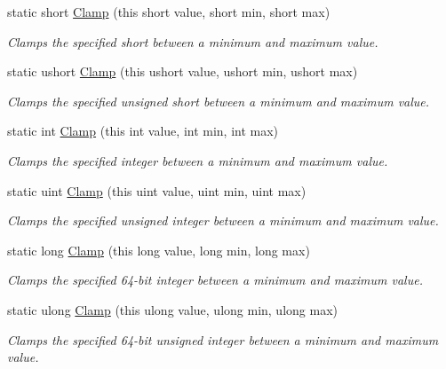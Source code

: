 \begin{DoxyCompactItemize}
\item 
static short \hyperlink{class_tri_devs_1_1_tri_engine2_d_1_1_extensions_1_1_integer_extensions_a3880786c9330dbbbdb27693548946679}{Clamp} (this short value, short min, short max)
\begin{DoxyCompactList}\small\item\em Clamps the specified short between a minimum and maximum value. \end{DoxyCompactList}\item 
static ushort \hyperlink{class_tri_devs_1_1_tri_engine2_d_1_1_extensions_1_1_integer_extensions_a3bfe7362bdb41d2af40a3001e6169f41}{Clamp} (this ushort value, ushort min, ushort max)
\begin{DoxyCompactList}\small\item\em Clamps the specified unsigned short between a minimum and maximum value. \end{DoxyCompactList}\item 
static int \hyperlink{class_tri_devs_1_1_tri_engine2_d_1_1_extensions_1_1_integer_extensions_a91d8379e75aa61d7da81b475389fb450}{Clamp} (this int value, int min, int max)
\begin{DoxyCompactList}\small\item\em Clamps the specified integer between a minimum and maximum value. \end{DoxyCompactList}\item 
static uint \hyperlink{class_tri_devs_1_1_tri_engine2_d_1_1_extensions_1_1_integer_extensions_ad1de9947d0793285110436926a60c6ec}{Clamp} (this uint value, uint min, uint max)
\begin{DoxyCompactList}\small\item\em Clamps the specified unsigned integer between a minimum and maximum value. \end{DoxyCompactList}\item 
static long \hyperlink{class_tri_devs_1_1_tri_engine2_d_1_1_extensions_1_1_integer_extensions_a290203fa17c0d1604379f8b0b1484e63}{Clamp} (this long value, long min, long max)
\begin{DoxyCompactList}\small\item\em Clamps the specified 64-\/bit integer between a minimum and maximum value. \end{DoxyCompactList}\item 
static ulong \hyperlink{class_tri_devs_1_1_tri_engine2_d_1_1_extensions_1_1_integer_extensions_a90d4d986a0e9c0ab7894a0efeff748c7}{Clamp} (this ulong value, ulong min, ulong max)
\begin{DoxyCompactList}\small\item\em Clamps the specified 64-\/bit unsigned integer between a minimum and maximum value. \end{DoxyCompactList}\end{DoxyCompactItemize}


